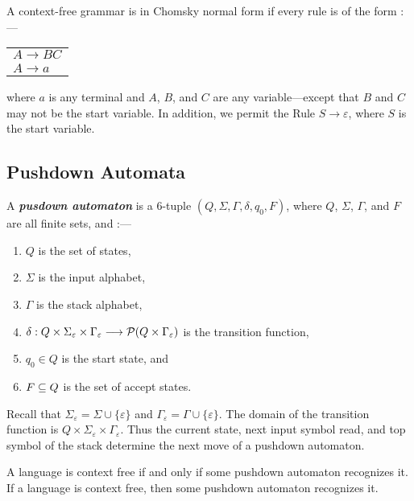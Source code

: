 \documentclass[12pt]{article}
\begin{document}
\begin{definition}
  A context-free grammar is in Chomsky normal form if every rule is of the
  form :---
  \begin{center}
    \begin{tabular}{l}
      $A \rightarrow BC$ \\
      $A \rightarrow a$ \\
    \end{tabular}
  \end{center}
  where $a$ is any terminal and $A$, $B$, and $C$ are any variable---except
  that $B$ and $C$ may not be the start variable. In addition, we permit the
  Rule $S \rightarrow \varepsilon$, where $S$ is the start variable.
\end{definition}

\subsection{Pushdown Automata}
\label{sec:orgdcf66e8}
\begin{definition}
  A \textit{\textbf{pusdown automaton}} is a 6-tuple
  $(Q,\Sigma,\Gamma,\delta,q_0,F)$, where $Q$, $\Sigma$, $\Gamma$, and $F$
  are all finite sets, and :---
  \begin{enumerate}
  \item $Q$ is the set of states,
  \item $\Sigma$ is the input alphabet,
  \item $\Gamma$ is the stack alphabet,
  \item $\delta : Q\times\Sigma_\varepsilon\times\Gamma_\varepsilon
    \longrightarrow \mathcal{P}(Q\times\Gamma_\varepsilon)$ is the transition function,
  \item $q_0 \in Q$ is the start state, and
  \item $F \subseteq Q$ is the set of accept states.
  \end{enumerate}
  Recall that $\Sigma_\varepsilon=\Sigma\cup\{\varepsilon\}$ and
  $\Gamma_\varepsilon=\Gamma\cup\{\varepsilon\}$. The domain of the transition
  function is $Q\times\Sigma_\varepsilon\times\Gamma_\varepsilon$. Thus the
  current state, next input symbol read, and top symbol of the stack determine
  the next move of a pushdown automaton.
\end{definition}

\begin{definition}
  A language is context free if and only if some pushdown automaton recognizes
  it. If a language is context free, then some pushdown automaton recognizes
  it.
\end{definition}
\end{document}
